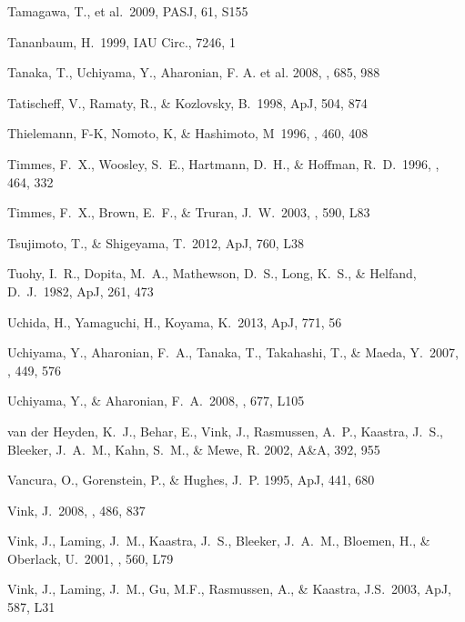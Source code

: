 \documentclass[11pt,a4paper]{article}
\begin{document}
{\begin{multicols}{2}
{\begin{thebibliography}{99}
 Tamagawa, T., et al.~2009,
  PASJ, 61, S155

 Tananbaum, H.\ 1999, IAU Circ.,
  7246, 1

Tanaka, T., Uchiyama, Y., Aharonian, F. A. et al. 2008, \apj, 685, 988

 Tatischeff, V., Ramaty,
  R., \& Kozlovsky, B.\ 1998, ApJ, 504, 874

 Thielemann, F-K,
  Nomoto, K, \& Hashimoto, M~1996, \apj, 460, 408

 Timmes, F.~X., Woosley, 
S.~E., Hartmann, D.~H., \& Hoffman, R.~D.\ 1996, \apj, 464, 332 

 Timmes, F.~X.,
  Brown, E.~F., \& Truran, J.~W.\ 2003, \apj, 590, L83

 Tsujimoto,
  T., \& Shigeyama, T.\ 2012, ApJ, 760, L38

Tuohy, I.~R., Dopita, M.~A.,
  Mathewson, D.~S., Long, K.~S., \& Helfand, D.~J.\ 1982, ApJ, 261,
  473

 Uchida, H., Yamaguchi, H., Koyama,
  K.\ 2013, ApJ, 771, 56

 Uchiyama, Y., Aharonian,
  F.~A., Tanaka, T., Takahashi, T., \& Maeda, Y.\ 2007, \nat, 449, 576

 Uchiyama, Y., \&
  Aharonian, F.~A.\ 2008, \apj, 677, L105

 van der Heyden,
  K.~J., Behar, E., Vink, J., Rasmussen, A.~P., Kaastra, J.~S.,
  Bleeker, J.~A.~M., Kahn, S.~M., \& Mewe, R. 2002, A\&A, 392, 955

 Vancura, O., Gorenstein, P.,
  \& Hughes, J.~P. 1995, ApJ, 441, 680


 Vink, J.\ 2008, \aap, 486, 837

 Vink, J., Laming, J.~M., Kaastra,
  J.~S., Bleeker, J.~A.~M., Bloemen, H., \& Oberlack, U.\ 2001, \apj,
  560, L79

 Vink, J., Laming, J.~M., Gu, M.F.,
  Rasmussen, A., \& Kaastra, J.S.\ 2003, ApJ, 587, L31


\end{thebibliography}}
\end{multicols}}
\end{document}
